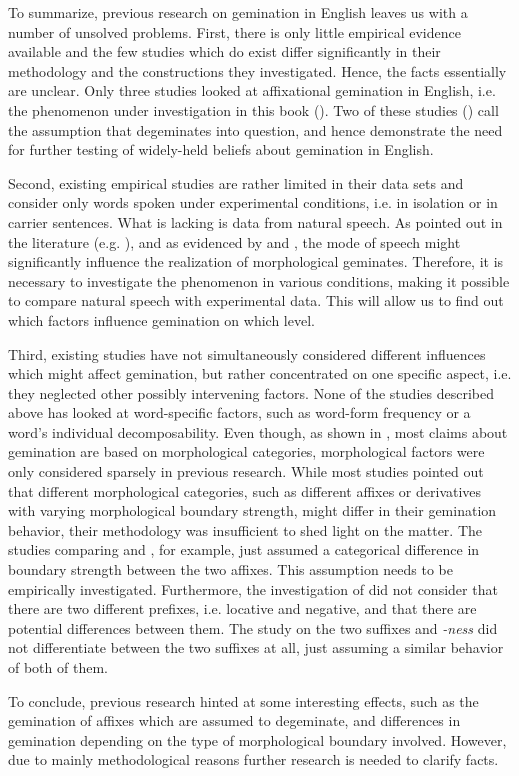 To summarize, previous research on gemination in English leaves us with a number of unsolved problems. First, there is only little empirical evidence available and the few studies which do exist differ significantly in their methodology and the constructions they investigated. Hence, the facts essentially are unclear. Only three studies looked at affixational gemination in English, i.e. the phenomenon under investigation in this book (\citealt{Kaye.2005, Oh.2012, Kotzor.2016}). Two of these studies (\citealt{Kaye.2005, Oh.2012}) call the assumption that  degeminates into question, and hence demonstrate the need for further testing of widely-held beliefs about gemination in English. 

Second, existing empirical studies are rather limited in their data sets and consider only words spoken under experimental conditions, i.e. in isolation or in carrier sentences. What is lacking is data from natural speech. As pointed out in the literature (e.g. \citealt{Giegerich.1992, Bauer.2013}), and as evidenced by \cite{Oh.2012} and \cite{Oh.2013}, the mode of speech might significantly influence the realization of morphological geminates. Therefore, it is necessary to investigate the phenomenon in various conditions, making it possible to compare natural speech with experimental data. This will allow us to find out which factors influence gemination on which level.

Third, existing studies have not simultaneously considered different influences which might affect gemination, but rather concentrated on one specific aspect, i.e. they neglected other possibly intervening factors. None of the studies described above has looked at word-specific factors, such as word-form frequency or a word's individual decomposability. Even though, as shown in , most claims about gemination are based on morphological categories, morphological factors were only considered sparsely in previous research. While most studies pointed out that different morphological categories, such as different affixes or derivatives with varying morphological boundary strength, might differ in their gemination behavior, their methodology was insufficient to shed light on the matter. 
The studies comparing  and , for example, just assumed a categorical difference in boundary strength between the two affixes. This assumption needs to be empirically investigated. Furthermore, the investigation of  did not consider that there are two different prefixes, i.e. locative and negative, and that there are potential differences between them. The study on the two suffixes  and \textit{-ness} did not differentiate between the two suffixes at all, just assuming a similar behavior of both of them. 

To conclude, previous research hinted at some interesting effects, such as the gemination of affixes which are assumed to degeminate, and differences in gemination depending on the type of morphological boundary involved. However, due to mainly methodological reasons further research is needed to clarify facts.

